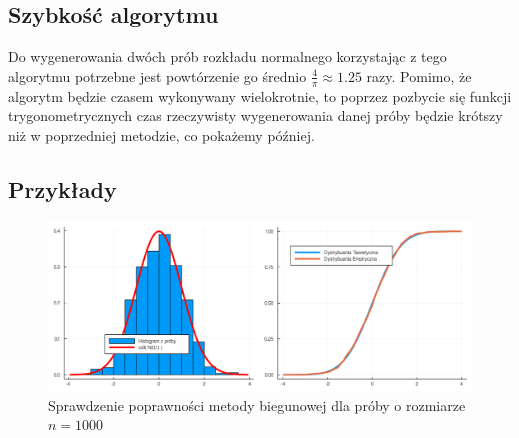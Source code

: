 \documentclass[12pt]{mwrep}
\begin{document}
	\subsection{Szybkość algorytmu}
	Do wygenerowania dwóch prób rozkładu normalnego korzystając z tego algorytmu potrzebne jest powtórzenie go średnio $\frac{4}{\pi}\approx1.25$ razy. Pomimo, że algorytm będzie czasem wykonywany wielokrotnie, to poprzez pozbycie się funkcji trygonometrycznych czas rzeczywisty wygenerowania danej próby będzie krótszy niż w poprzedniej metodzie, co pokażemy później.
	
	\subsection{Przykłady}

	\begin{figure}[H]\caption{Sprawdzenie poprawności metody biegunowej dla próby o rozmiarze $n=1000$}\label{fig:pol}
		\includegraphics[width=\columnwidth]{fig/fig_pol.png}
	\end{figure}
\end{document}
